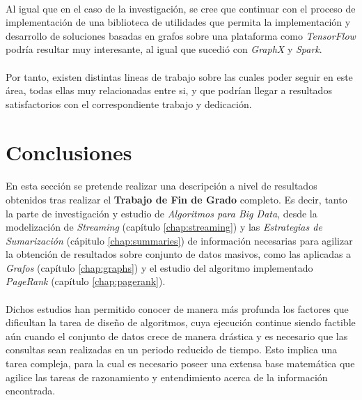 \documentclass{subfiles}
\begin{document}
      \paragraph{}
      Al igual que en el caso de la investigación, se cree que continuar con el proceso de implementación de una biblioteca de utilidades que permita la implementación y desarrollo de soluciones basadas en grafos sobre una plataforma como \emph{TensorFlow} podría resultar muy interesante, al igual que sucedió con \emph{GraphX} y \emph{Spark}.

      \paragraph{}
      Por tanto, existen distintas lineas de trabajo sobre las cuales poder seguir en este área, todas ellas muy relacionadas entre si, y que podrían llegar a resultados satisfactorios con el correspondiente trabajo y dedicación.

    \section{Conclusiones}
    \label{sec:implementation_conclusions}

      \paragraph{}
      En esta sección se pretende realizar una descripción a nivel de resultados obtenidos tras realizar el \textbf{Trabajo de Fin de Grado} completo. Es decir, tanto la parte de investigación y estudio de \emph{Algoritmos para Big Data}, desde la modelización de \emph{Streaming} (capítulo \ref{chap:streaming}) y las \emph{Estrategias de Sumarización} (cápitulo \ref{chap:summaries}) de información necesarias para agilizar la obtención de resultados sobre conjunto de datos masivos, como las aplicadas a \emph{Grafos} (capítulo \ref{chap:graphs}) y el estudio del algoritmo implementado \emph{PageRank} (capítulo \ref{chap:pagerank}).

      \paragraph{}
      Dichos estudios han permitido conocer de manera más profunda los factores que dificultan la tarea de diseño de algoritmos, cuya ejecución continue siendo factible aún cuando el conjunto de datos crece de manera drástica y es necesario que las consultas sean realizadas en un periodo reducido de tiempo. Esto implica una tarea compleja, para la cual es necesario poseer una extensa base matemática que agilice las tareas de razonamiento y entendimiento acerca de la información encontrada.
\end{document}
